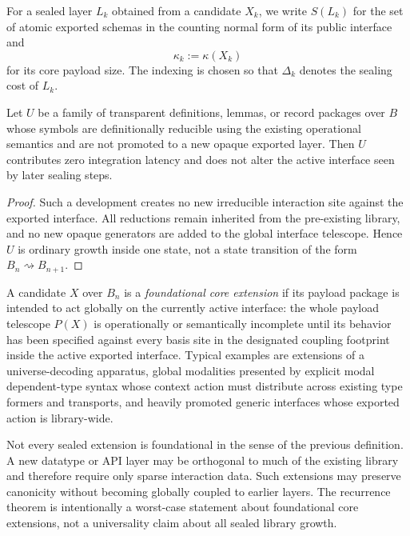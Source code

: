 For a sealed layer \(L_k\) obtained from a candidate \(X_k\), we write \(S(L_k)\) for the set
of atomic exported schemas in the counting normal form of its public interface and
\[
  \kappa_k := \kappa(X_k)
\]
for its core payload size.  The indexing is chosen so that \(\Delta_k\) denotes the sealing cost
of \(L_k\).

\begin{proposition}
Let \(U\) be a family of transparent definitions, lemmas, or record packages over \(B\) whose
symbols are definitionally reducible using the existing operational semantics and are not
promoted to a new opaque exported layer.  Then \(U\) contributes zero integration latency and
does not alter the active interface seen by later sealing steps.
\end{proposition}

\begin{proof}
Such a development creates no new irreducible interaction site against the exported
interface.  All reductions remain inherited from the pre-existing library, and no new opaque
generators are added to the global interface telescope.  Hence \(U\) is ordinary growth inside
one state, not a state transition of the form \(B_n\rightsquigarrow B_{n+1}\).
\end{proof}

\begin{definition}
A candidate \(X\) over \(B_n\) is a \emph{foundational core extension} if its payload package is
intended to act globally on the currently active interface: the whole payload telescope
\(P(X)\) is operationally or semantically incomplete until its behavior has been specified
against every basis site in the designated coupling footprint inside the active exported
interface.  Typical examples are extensions of a universe-decoding apparatus, global
modalities presented by explicit modal dependent-type syntax whose context action must
distribute across existing type formers and transports, and heavily promoted generic
interfaces whose exported action is library-wide.
\end{definition}

\begin{remark}
Not every sealed extension is foundational in the sense of the previous definition.  A new
datatype or API layer may be orthogonal to much of the existing library and therefore require
only sparse interaction data.  Such extensions may preserve canonicity without becoming
globally coupled to earlier layers.  The recurrence theorem is intentionally a worst-case
statement about foundational core extensions, not a universality claim about all sealed
library growth.
\end{remark}

